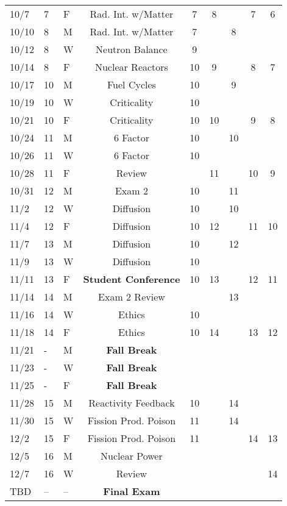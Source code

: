 \documentclass[11pt, a4paper]{article}
\begin{document}
\begin{table}[h]
\begin{center}
\begin{tabular}{lllcccccc}
10/7 & 7 & F & Rad. Int. w/Matter  & 7 & 8 &  & 7 & 6 \\
10/10 & 8 & M & Rad. Int. w/Matter     & 7 &  & 8 &  &  \\
10/12 & 8 & W & Neutron Balance         & 9 &   &  &  &  \\
10/14 & 8 & F & Nuclear Reactors        & 10 & 9 &  & 8 & 7 \\
10/17 & 10 & M & Fuel Cycles          & 10 &  & 9 &  &  \\
10/19 & 10 & W & Criticality          & 10 &  &  &  &  \\
10/21 & 10 & F & Criticality          & 10 & 10 &  & 9 & 8 \\
10/24 & 11 & M & 6 Factor            & 10 &  & 10 &  &  \\
10/26 & 11 & W & 6 Factor            & 10 &  &  &  & \\
10/28 & 11 & F & Review  &  &  11 &  & 10 & 9 \\
10/31 & 12 & M & Exam 2 &  10  &   & 11 &  &  \\
11/2 & 12 & W & Diffusion & 10  &  & 10 &  &  \\
11/4 & 12 & F & Diffusion & 10 & 12 &  & 11 & 10 \\
11/7 & 13 & M & Diffusion & 10 &  & 12 & &  \\
11/9 & 13 & W & Diffusion & 10 &  &  &  &  \\
11/11 & 13 & F & \textbf{Student Conference}    & 10 & 13 &  & 12 & 11 \\
11/14 & 14 & M & Exam 2 Review    &  &  & 13  &  &  \\
11/16 & 14 & W & Ethics     & 10 & &  &  & \\
11/18 & 14 & F & Ethics    & 10 & 14 &  & 13 & 12 \\
11/21 & - & M & \textbf{Fall Break}&  &  &  &  &  \\
11/23 & - & W & \textbf{Fall Break}&  &  &  &  &  \\
11/25 & - & F & \textbf{Fall Break}&  &  &  &  &  \\
11/28 & 15 & M & Reactivity Feedback    & 10  &  & 14 & &  \\
11/30 & 15 & W & Fission Prod. Poison        & 11 &  & 14 &  &  \\
12/2 & 15 & F & Fission Prod. Poison        & 11 &  &  & 14 & 13 \\
12/5 & 16 & M & Nuclear Power                &  &  & &  &      \\
12/7 & 16 & W &  Review               &  &  &  &  &  14 \\
TBD & -- & -- & \textbf{Final Exam}  &  &  &  &  &     \\
\end{tabular}
\end{center}
\end{table}
\FloatBarrier



\end{document}
